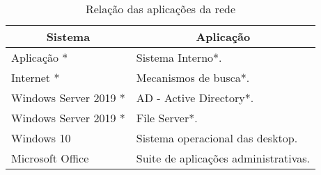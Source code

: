 \begin{table}[h!]
	\centering
	\renewcommand{\arraystretch}{2.0}
	\caption{Relação das aplicações da rede}
	\label{tab3}
	\begin{tabular}{|l|l|}
		\hline
		\multicolumn{1}{|c|}{\textbf{Sistema}} &	 \multicolumn{1}{|c|}{\textbf{Aplicação}}                                 		  \\ \hline
		Aplicação  *                                 
		& Sistema Interno*.
		\\ \hline	
		Internet  *                                 
		& Mecanismos de busca*.
		\\ \hline	
		Windows Server 2019 *                                 
		& AD - Active Directory*.
		\\ \hline
		Windows Server 2019 *                                 
		& File Server*.
		\\ \hline
		Windows 10                                 
		& Sistema operacional das desktop.
		\\ \hline
		Microsoft Office                                 
		& Suite de aplicações administrativas.
		\\ \hline		
	\end{tabular}
\end{table}